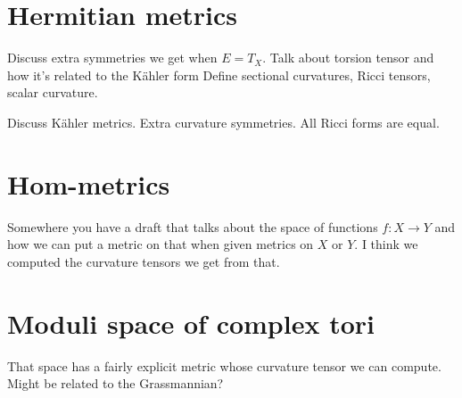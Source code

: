 \documentclass[11pt]{article}
\begin{document}
\section{Hermitian metrics}
\label{sec:orgad8dbb1}

Discuss extra symmetries we get when \(E = T_X\).
Talk about torsion tensor and how it's related to the K\"ahler form
Define sectional curvatures, Ricci tensors, scalar curvature.

Discuss K\"ahler metrics. Extra curvature symmetries. All Ricci forms are equal.


\section{Hom-metrics}

Somewhere you have a draft that talks about the space of functions $f : X \to Y$ and how we can put a metric on that when given metrics on $X$ or $Y$. I think we computed the curvature tensors we get from that.


\section{Moduli space of complex tori}

That space has a fairly explicit metric whose curvature tensor we can compute. Might be related to the Grassmannian?




\end{document}
